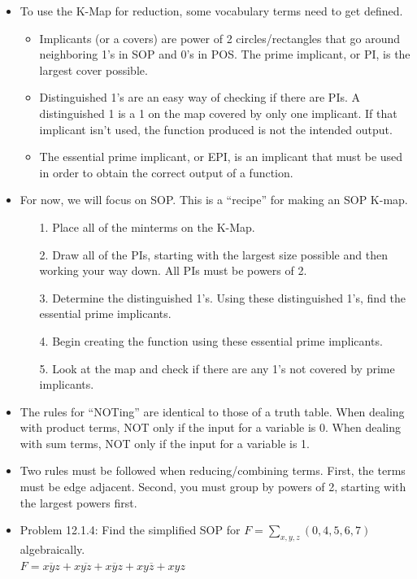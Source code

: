\documentclass[10pt,a4paper]{article}
\newcommand{\ol}[1]{\overline{#1}}
\begin{document}
\begin{itemize}
\item To use the K-Map for reduction, some vocabulary terms need to get defined.
\begin{itemize}
\item Implicants (or a covers) are power of 2 circles/rectangles that go around neighboring 1's in SOP and 0's in POS. The prime implicant, or PI, is the largest cover possible. 
\item Distinguished 1's are an easy way of checking if there are PIs. A distinguished 1 is a 1 on the map covered by only one implicant. If that implicant isn't used, the function produced is not the intended output. 
\item The essential prime implicant, or EPI, is an implicant that must be used in order to obtain the correct output of a function. 
\end{itemize}
\item For now, we will focus on SOP. This is a ``recipe'' for making an SOP K-map.
\begin{enumerate}
\item [1.] Place all of the minterms on the K-Map.
\item [2.] Draw all of the PIs, starting with the largest size possible and then working your way down. All PIs must be powers of 2. 
\item [3.] Determine the distinguished 1's. Using these distinguished 1's, find the essential prime implicants. 
\item [4.] Begin creating the function using these essential prime implicants.
\item [5.] Look at the map and check if there are any 1's not covered by prime implicants. 
\end{enumerate}
\item The rules for ``NOTing'' are identical to those of a truth table. When dealing with product terms, NOT only if the input for a variable is 0. When dealing with sum terms, NOT only if the input for a variable is 1. 
\item Two rules must be followed when reducing/combining terms. First, the terms must be edge adjacent. Second, you must group by powers of 2, starting with the largest powers first.
\item Problem 12.1.4: Find the simplified SOP for $F=\sum_{x,y,z}(0,4,5,6,7)$ algebraically.\\
$F=\ol{xyz}+x\ol{yz}+x\ol{y}z+xy\ol{z}+xyz$\\

\end{itemize}
\end{document}
